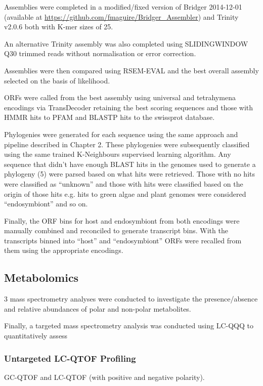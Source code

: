 Assemblies were completed in a modified/fixed version of 
Bridger 2014-12-01 \citep{Chang2015} (available at
\url{https://github.com/fmaguire/Bridger_Assembler}) and 
Trinity v2.0.6 \citep{Grabherr2011,Haas2013} both with K-mer
sizes of 25.

An alternative Trinity assembly was also completed using
SLIDINGWINDOW Q30 trimmed reads without normalisation or 
error correction.

Assemblies were then compared using RSEM-EVAL \citep{Li2014} and the best
overall assembly selected on the basis of likelihood.

ORFs were called from the best assembly using universal and tetrahymena encodings 
via TransDecoder \citep{Haas2013} retaining the best scoring sequences and those
with HMMR hits to PFAM and BLASTP hits to the swissprot database. 

Phylogenies were generated for each sequence using the same approach and pipeline
described in Chapter 2. These phylogenies were subsequently classified using the 
same trained K-Neighbours supervised learning algorithm.
Any sequence that didn't have enough BLAST hits in the genomes used to generate
a phylogeny (5) were parsed based on what hits were retrieved.
Those with no hits were classified as ``unknown'' and those with
hits were classified based on the origin of those hits e.g. hits
to green algae and plant genomes were considered ``endosymbiont'' and so on.

Finally, the ORF bins for host and endosymbiont 
from both encodings were manually combined and reconciled
to generate transcript bins.  With the transcripts binned into
``host'' and ``endosymbiont'' ORFs were recalled from them using the appropriate
encodings. 




\subsection{Metabolomics}

3 mass spectrometry analyses were conducted to investigate the presence/absence
and relative abundances of polar and non-polar metabolites.

Finally, a targeted mass spectrometry analysis was conducted using
LC-QQQ to quantitatively assess 



\subsubsection{Untargeted LC-QTOF Profiling}
GC-QTOF and LC-QTOF (with positive and negative polarity).


